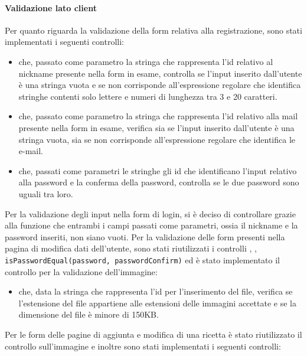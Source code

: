 \paragraph{Validazione lato client}\label{par:validazione_lato_client}
Per quanto riguarda la validazione della form relativa alla registrazione, sono stati implementati i seguenti controlli:
\begin{itemize}
	\item {} che, passato come parametro la stringa che rappresenta l'id relativo al nickname presente nella form in esame, controlla se l'input inserito dall'utente è una stringa vuota e se non corrisponde all'espressione regolare che identifica stringhe contenti solo lettere e numeri di lunghezza tra 3 e 20 caratteri.
	\item {} che, passato come parametro la stringa che rappresenta l'id relativo alla mail presente nella form in esame, verifica sia se l'input inserito dall'utente è una stringa vuota, sia se non corrisponde all'espressione regolare che identifica le e-mail.
	\item {} che, passati come parametri le stringhe gli id che identificano l'input relativo alla password e la conferma della password, controlla se le due password sono uguali tra loro.
\end{itemize}
Per la validazione degli input nella form di login, si è deciso di controllare grazie alla funzione  che entrambi i campi passati come parametri, ossia il nickname e la password inseriti, non siano vuoti. \newline
Per la validazione delle form presenti nella pagina di modifica dati dell'utente, sono stati riutilizzati i controlli , , \texttt{isPasswordEqual(password, passwordConfirm)} ed è stato implementato il controllo per la validazione dell'immagine:
\begin{itemize}
	\item {} che, data la stringa che rappresenta l'id per l'inserimento del file, verifica se l'estensione del file appartiene alle estensioni delle immagini accettate e se la dimensione del file è minore di 150KB.
\end{itemize}
Per le form delle pagine di aggiunta e modifica di una ricetta è stato riutilizzato il controllo sull'immagine e inoltre sono stati implementati i seguenti controlli:
